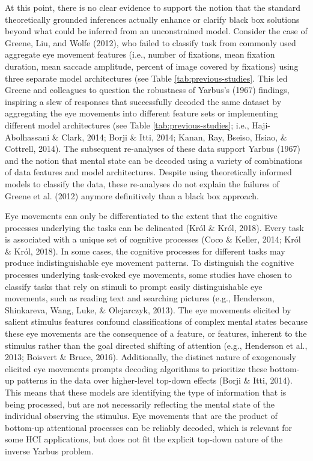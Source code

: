 \documentclass[
  english,
  man,floatsintext]{apa6}
\begin{document}
At this point, there is no clear evidence to support the notion that the standard theoretically grounded inferences actually enhance or clarify black box solutions beyond what could be inferred from an unconstrained model. Consider the case of Greene, Liu, and Wolfe (2012), who failed to classify task from commonly used aggregate eye movement features (i.e., number of fixations, mean fixation duration, mean saccade amplitude, percent of image covered by fixations) using three separate model architectures (see Table \ref{tab:previous-studies}. This led Greene and colleagues to question the robustness of Yarbus's (1967) findings, inspiring a slew of responses that successfully decoded the same dataset by aggregating the eye movements into different feature sets or implementing different model architectures (see Table \ref{tab:previous-studies}; i.e., Haji-Abolhassani \& Clark, 2014; Borji \& Itti, 2014; Kanan, Ray, Bseiso, Hsiao, \& Cottrell, 2014). The subsequent re-analyses of these data support Yarbus (1967) and the notion that mental state can be decoded using a variety of combinations of data features and model architectures. Despite using theoretically informed models to classify the data, these re-analyses do not explain the failures of Greene et al. (2012) anymore definitively than a black box approach.

Eye movements can only be differentiated to the extent that the cognitive processes underlying the tasks can be delineated (Król \& Król, 2018). Every task is associated with a unique set of cognitive processes (Coco \& Keller, 2014; Król \& Król, 2018). In some cases, the cognitive processes for different tasks may produce indistinguishable eye movement patterns. To distinguish the cognitive processes underlying task-evoked eye movements, some studies have chosen to classify tasks that rely on stimuli to prompt easily distinguishable eye movements, such as reading text and searching pictures (e.g., Henderson, Shinkareva, Wang, Luke, \& Olejarczyk, 2013). The eye movements elicited by salient stimulus features confound classifications of complex mental states because these eye movements are the consequence of a feature, or features, inherent to the stimulus rather than the goal directed shifting of attention (e.g., Henderson et al., 2013; Boisvert \& Bruce, 2016). Additionally, the distinct nature of exogenously elicited eye movements prompts decoding algorithms to prioritize these bottom-up patterns in the data over higher-level top-down effects (Borji \& Itti, 2014). This means that these models are identifying the type of information that is being processed, but are not necessarily reflecting the mental state of the individual observing the stimulus. Eye movements that are the product of bottom-up attentional processes can be reliably decoded, which is relevant for some HCI applications, but does not fit the explicit top-down nature of the inverse Yarbus problem.
\end{document}
